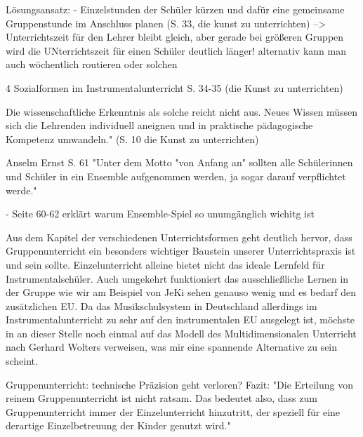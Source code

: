Lösungsansatz:
- Einzelstunden der Schüler kürzen und dafür eine gemeinsame Gruppenstunde im
Anschluss planen (S. 33, die kunst zu unterrichten)
--> Unterrichtszeit für den Lehrer bleibt gleich, aber gerade bei größeren
Gruppen wird die UNterrichtszeit für einen Schüler deutlich länger!
    alternativ kann man auch wöchentlich routieren oder solchen


4 Sozialformen im Instrumentalunterricht S. 34-35    (die Kunst zu unterrichten)

Die wissenschaftliche Erkenntnis als solche reicht nicht aus. Neues Wissen
müssen sich die Lehrenden individuell aneignen und in praktische pädagogische
Kompetenz umwandeln." (S. 10 die Kunst zu unterrichten)

Anselm Ernst S. 61 "Unter dem Motto "von Anfang an" sollten alle Schülerinnen und
Schüler in ein Ensemble aufgenommen werden, ja sogar darauf verpflichtet werde."

- Seite 60-62 erklärt warum Ensemble-Spiel so unumgänglich wichitg ist

Aus dem Kapitel der verschiedenen Unterrichtsformen geht deutlich hervor, dass
Gruppenunterricht ein besonders wichtiger Baustein unserer Unterrichtspraxis
ist und sein sollte. Einzelunterricht alleine bietet nicht das ideale Lernfeld
für Instrumentalschüler. Auch umgekehrt funktioniert das ausschließliche Lernen
in der Gruppe wie wir am Beispiel von JeKi sehen genauso wenig und es bedarf den
zusätzlichen EU. Da das Musikschulsystem in Deutschland allerdings im
Instrumentalunterricht zu sehr auf den instrumentalen EU ausgelegt ist, möchste
in an dieser Stelle noch einmal auf das Modell des Multidimensionalen Unterricht
nach Gerhard Wolters verweisen, was mir eine spannende Alternative zu sein
scheint. 


Gruppenunterricht: technische Präzision geht verloren? 
Fazit: "Die  Erteilung von reinem Gruppenunterricht ist nicht ratsam. Das
bedeutet also, dass zum Gruppenunterricht immer der Einzelunterricht hinzutritt,
der speziell für eine derartige Einzelbetreuung der Kinder genutzt wird."
\autocite[57]{ernst:die_zukunftsfaehige_musikschule}
